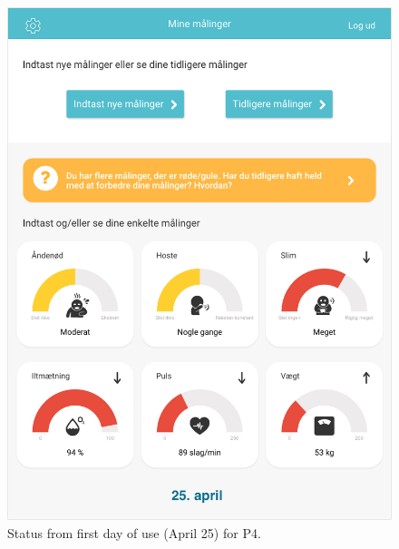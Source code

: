 \begin{figure}[h]
  \centering
  \begin{minipage}[b]{0.45\textwidth}
    \includegraphics[width=\textwidth]{images/study3/Gunnar12.png}
    \caption{Status from first day of use (April 25) for P4.}
    \label{fig:gunnar12}
  \end{minipage}
  \hfill
  \begin{minipage}[b]{0.45\textwidth}

\end{minipage}
\end{figure}
